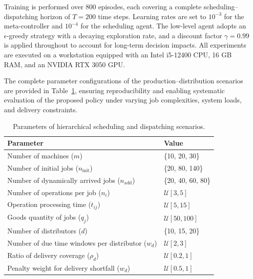\documentclass{article}
\begin{document}
Training is performed over 800 episodes, each covering a complete scheduling–dispatching horizon of $T=200$ time steps. Learning rates are set to $10^{-3}$ for the meta-controller and $10^{-4}$ for the scheduling agent. The low-level agent adopts an $\epsilon$-greedy strategy with a decaying exploration rate, and a discount factor $\gamma=0.99$ is applied throughout to account for long-term decision impacts. All experiments are executed on a workstation equipped with an Intel i5-12400 CPU, 16 GB RAM, and an NVIDIA RTX 3050 GPU.

The complete parameter configurations of the production–distribution scenarios are provided in Table~\ref{tab:benchmark-parameters}, ensuring reproducibility and enabling systematic evaluation of the proposed policy under varying job complexities, system loads, and delivery constraints.


\begin{table}[H]
\centering
\caption{Parameters of hierarchical scheduling and dispatching scenarios.}
\label{tab:benchmark-parameters}
\begin{tabular}{p{7.5cm} p{4cm}}
\toprule
\textbf{Parameter} & \textbf{Value} \\
\midrule
Number of machines ($m$) & \{10, 20, 30\} \\
Number of initial jobs ($n_{\text{init}}$) & \{20, 80, 140\} \\
Number of dynamically arrived jobs ($n_{\text{add}}$) & \{20, 40, 60, 80\} \\
Number of operations per job ($n_i$) & $\mathcal{U}[3, 5]$ \\
Operation processing time ($t_{ij}$) & $\mathcal{U}[5, 15]$ \\
Goods quantity of jobs ($q_j$) & $\mathcal{U}[50, 100]$ \\
Number of distributors ($d$) & \{10, 15, 20\} \\
Number of due time windows per distributor ($w_d$) & $\mathcal{U}[2, 3]$ \\
Ratio of delivery coverage ($\rho_d$) & $\mathcal{U}[0.2, 1]$ \\
Penalty weight for delivery shortfall ($w_d$) & $\mathcal{U}[0.5, 1]$ \\

\bottomrule
\end{tabular}
\end{table}
\end{document}
